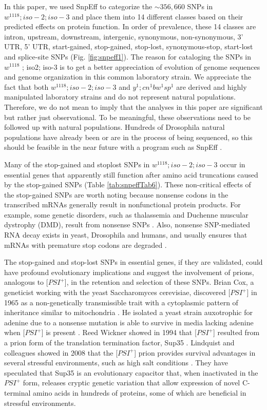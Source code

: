 In this paper, we used SnpEff to categorize the $\sim356,660$ SNPs in $w^{1118} ; iso-2; iso-3$ and place them into 14 different classes based on their predicted effects on protein function. In order of prevalence, these 14 classes are intron, upstream, downstream, intergenic, synonymous, non-synonymous, 3' UTR, 5' UTR, start-gained, stop-gained, stop-lost, synonymous-stop, start-lost and splice-site SNPs (Fig. \ref{fig:snpeff1}). The reason for cataloging the SNPs in $w^{1118}$ ; iso2; iso-3 is to get a better appreciation of evolution of genome sequences and genome organization in this common laboratory strain. We appreciate the fact that both $w^{1118} ; iso-2; iso-3$ and $y^1 ; cn^1 bw^1 sp^1$ are derived and highly manipulated laboratory strains and do not represent natural populations. Therefore, we do not mean to imply that the analyses in this paper are significant but rather just observational. To be meaningful, these observations need to be followed up with natural populations. Hundreds of Drosophila natural populations have already been or are in the process of being sequenced, so this should be feasible in the near future with a program such as SnpEff \cite{anderson2009molecular}.

Many of the stop-gained and stoplost SNPs in $w^{1118} ; iso-2; iso-3$ occur in essential genes that apparently still function after amino acid truncations caused by the stop-gained SNPs (Table \ref{tab:snpeffTab6}). These non-critical effects of the stop-gained SNPs are worth noting because nonsense codons in the transcribed mRNAs generally result in nonfunctional protein products. For example, some genetic disorders, such as thalassemia and Duchenne muscular dystrophy (DMD), result from nonsense SNPs \cite{flanigan2009dmd,tran2007nonsense,chang1979beta}. Also, nonsense SNP-mediated RNA decay exists in yeast, Drosophila and humans, and usually ensures that mRNAs with premature stop codons are degraded \cite{gatfield2003nonsense}.

The stop-gained and stop-lost SNPs in essential genes, if they are validated, could have profound evolutionary implications and suggest the involvement of prions, analogous to [$PSI^+$], in the retention and selection of these SNPs.  Brian Cox, a geneticist working with the yeast Saccharomyces cerevisiae, discovered [$PSI^+$] in 1965 as a non-genetically transmissible trait with a cytoplasmic pattern of inheritance similar to mitochondria \cite{cox1988psi}. He isolated a yeast strain auxotrophic for adenine due to a nonsense mutation is able to survive in media lacking adenine when [$PSI^+$] is present \cite{cox1988psi}. Reed Wickner showed in 1994 that [$PSI^+$] resulted from a prion form of the translation termination factor, Sup35 \cite{wickner1994ure3}. Lindquist and colleagues showed in 2008 that the [$PSI^+$] prion provides survival advantages in several stressful environments, such as high salt conditions \cite{tyedmers2008prion}. They have speculated that Sup35 is an evolutionary capacitor that, when inactivated in the $PSI^+$ form, releases cryptic genetic variation that allow expression of novel C-terminal amino acids in hundreds of proteins, some of which are beneficial in stressful environments. 

